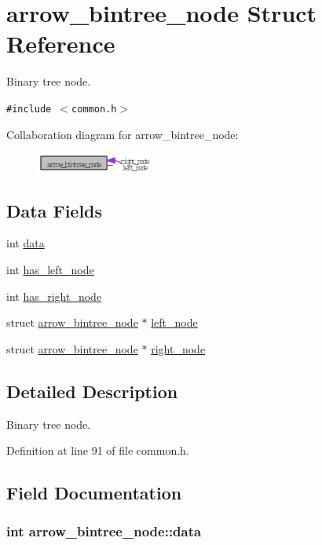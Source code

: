 \hypertarget{structarrow__bintree__node}{
\section{arrow\_\-bintree\_\-node Struct Reference}
\label{structarrow__bintree__node}
}
Binary tree node.  


{\tt \#include $<$common.h$>$}

Collaboration diagram for arrow\_\-bintree\_\-node:\nopagebreak
\begin{figure}[H]
\begin{center}
\leavevmode
\includegraphics[width=109pt]{structarrow__bintree__node__coll__graph}
\end{center}
\end{figure}
\subsection*{Data Fields}
\begin{CompactItemize}
\item 
int \hyperlink{structarrow__bintree__node_de01c6e7aa823db027836d77e7ce48b6}{data}
\item 
int \hyperlink{structarrow__bintree__node_a359d3d029023fb8763af3329207ee53}{has\_\-left\_\-node}
\item 
int \hyperlink{structarrow__bintree__node_f6f8bb35c520a88841a810777e9bc186}{has\_\-right\_\-node}
\item 
struct \hyperlink{structarrow__bintree__node}{arrow\_\-bintree\_\-node} $\ast$ \hyperlink{structarrow__bintree__node_e7eb125cad02704a57796b16c49b2983}{left\_\-node}
\item 
struct \hyperlink{structarrow__bintree__node}{arrow\_\-bintree\_\-node} $\ast$ \hyperlink{structarrow__bintree__node_4875801983f2b0220212951e6c0130af}{right\_\-node}
\end{CompactItemize}


\subsection{Detailed Description}
Binary tree node. 

Definition at line 91 of file common.h.

\subsection{Field Documentation}
\hypertarget{structarrow__bintree__node_de01c6e7aa823db027836d77e7ce48b6}{
\subsubsection{\setlength{\rightskip}{0pt plus 5cm}int {\bf arrow\_\-bintree\_\-node::data}}}
\label{structarrow__bintree__node_de01c6e7aa823db027836d77e7ce48b6}


